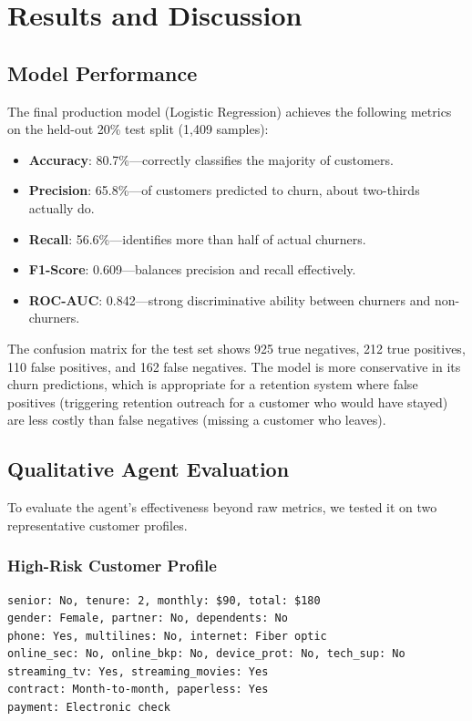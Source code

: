 \section{Results and Discussion}

\subsection{Model Performance}

The final production model (Logistic Regression) achieves the following metrics on the
held-out 20\% test split (1,409 samples):

\begin{itemize}[leftmargin=*]
    \item \textbf{Accuracy}: 80.7\%---correctly classifies the majority of customers.
    \item \textbf{Precision}: 65.8\%---of customers predicted to churn, about two-thirds
        actually do.
    \item \textbf{Recall}: 56.6\%---identifies more than half of actual churners.
    \item \textbf{F1-Score}: 0.609---balances precision and recall effectively.
    \item \textbf{ROC-AUC}: 0.842---strong discriminative ability between churners and
        non-churners.
\end{itemize}

The confusion matrix for the test set shows 925 true negatives, 212 true positives,
110 false positives, and 162 false negatives. The model is more conservative in its
churn predictions, which is appropriate for a retention system where false positives
(triggering retention outreach for a customer who would have stayed) are less costly
than false negatives (missing a customer who leaves).

\subsection{Qualitative Agent Evaluation}

To evaluate the agent's effectiveness beyond raw metrics, we tested it on two
representative customer profiles.

\subsubsection{High-Risk Customer Profile}

\begin{lstlisting}[caption=High-Risk customer input features.]
senior: No, tenure: 2, monthly: $90, total: $180
gender: Female, partner: No, dependents: No
phone: Yes, multilines: No, internet: Fiber optic
online_sec: No, online_bkp: No, device_prot: No, tech_sup: No
streaming_tv: Yes, streaming_movies: Yes
contract: Month-to-month, paperless: Yes
payment: Electronic check
\end{lstlisting}

